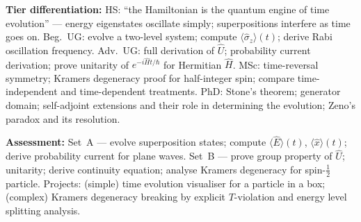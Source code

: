 \documentclass[11pt,a4paper]{article}
\begin{document}
\begin{tcolorbox}[modulebox, title={Module~I.3 --- Lecture L05: Time Evolution I --- Time-Independent Hamiltonians}]
\medskip\textbf{Tier differentiation:}
HS: ``the Hamiltonian is the quantum engine of time evolution'' --- energy eigenstates
oscillate simply; superpositions interfere as time goes on.
Beg.\ UG: evolve a two-level system; compute $\langle\hat{\sigma}_z\rangle(t)$;
derive Rabi oscillation frequency.
Adv.\ UG: full derivation of $\hat{U}$; probability current derivation;
prove unitarity of $e^{-i\hat{H}t/\hbar}$ for Hermitian $\hat{H}$.
MSc: time-reversal symmetry; Kramers degeneracy proof for half-integer spin;
compare time-independent and time-dependent treatments.
PhD: Stone's theorem; generator domain; self-adjoint extensions and their role in
determining the evolution; Zeno's paradox and its resolution.

\medskip\textbf{Assessment:}
Set~A --- evolve superposition states; compute $\langle\hat{E}\rangle(t)$,
$\langle\hat{x}\rangle(t)$; derive probability current for plane waves.
Set~B --- prove group property of $\hat{U}$; unitarity; derive continuity equation;
analyse Kramers degeneracy for spin-$\tfrac{1}{2}$ particle.
Projects: (simple) time evolution visualiser for a particle in a box;
(complex) Kramers degeneracy breaking by explicit $T$-violation and energy level
splitting analysis.
\end{tcolorbox}
\end{document}
